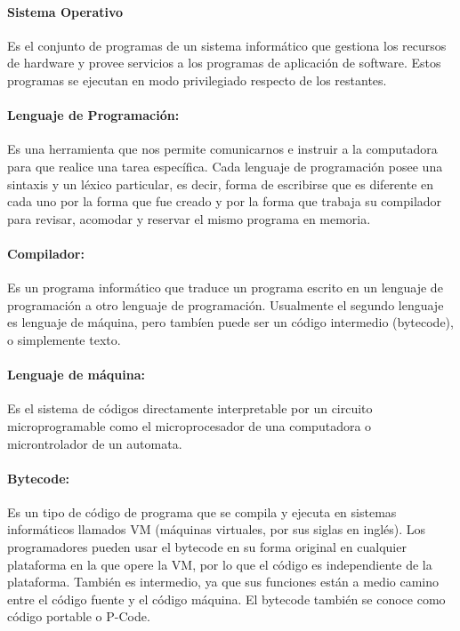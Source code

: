 \paragraph{Sistema Operativo} Es el conjunto de programas de un sistema informático que gestiona los recursos de hardware y provee servicios a los programas de aplicación de software. Estos programas se ejecutan en modo privilegiado respecto de los restantes.

\paragraph{Lenguaje de Programación:} Es una herramienta
que nos permite comunicarnos e instruir a la computadora para que realice una tarea específica. Cada
 lenguaje de programación posee una sintaxis y un léxico particular, es decir, forma de escribirse que
 es diferente en cada uno por la forma que fue creado y por la forma que trabaja su compilador para
revisar, acomodar y reservar el mismo programa en memoria.

\paragraph{Compilador:} Es un programa informático que traduce un programa escrito en un lenguaje de programación a otro lenguaje de programación. Usualmente el segundo lenguaje es lenguaje de máquina, pero tambíen puede ser un código intermedio (bytecode), o simplemente texto.

\paragraph{Lenguaje de máquina:} Es el sistema de códigos directamente interpretable por un circuito microprogramable como el microprocesador de una computadora o microntrolador de un automata.

\paragraph{Bytecode:} Es un tipo de código de programa que se compila y ejecuta en sistemas informáticos llamados VM (máquinas virtuales, por sus siglas en inglés). Los programadores pueden usar el bytecode en su forma original en cualquier plataforma en la que opere la VM, por lo que el código es independiente de la plataforma. También es intermedio, ya que sus funciones están a medio camino entre el código fuente y el código máquina. El bytecode también se conoce como código portable o P-Code.
 
